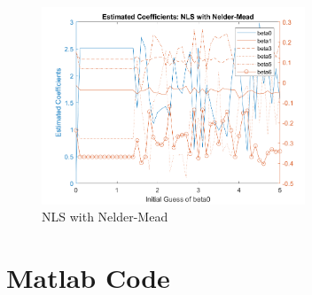 \documentclass[11pt,letter]{article}
\begin{document}
\begin{figure}
\begin{center}
\caption{NLS with Nelder-Mead}
\includegraphics[width=0.7\textwidth]{NLS_NM.png} 
\end{center}
\end{figure}






\section*{Matlab Code}

\end{document}
